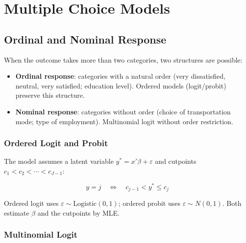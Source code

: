 \chapter{Multiple Choice Models}
\label{cap:multinomial}

\section{Ordinal and Nominal Response}

When the outcome takes more than two categories, two structures are
possible:

\begin{itemize}
  \item \textbf{Ordinal response}: categories with a natural order (very dissatisfied,
  neutral, very satisfied; education level). Ordered models (logit/probit)
  preserve this structure.
  \item \textbf{Nominal response}: categories without order (choice of transportation
  mode; type of employment). Multinomial logit without order restriction.
\end{itemize}

\subsection*{Ordered Logit and Probit}

The model assumes a latent variable $y^* = x'\beta + \varepsilon$ and cutpoints
$c_1 < c_2 < \cdots < c_{J-1}$:

\[
  y = j \quad\Longleftrightarrow\quad c_{j-1} < y^* \leq c_j
\]

Ordered logit uses $\varepsilon \sim \mathrm{Logistic}(0,1)$; ordered probit
uses $\varepsilon \sim N(0,1)$. Both estimate $\beta$ and the cutpoints by MLE.

\subsection*{Multinomial Logit}

